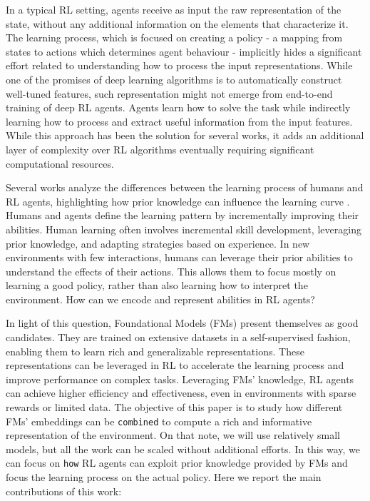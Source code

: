 In a typical RL setting, agents receive as input the raw representation of the state, without any additional information on the elements that characterize it. The learning process, which is focused on creating a policy - a mapping from states to actions which determines agent behaviour - implicitly hides a significant effort related to understanding how to process the input representations. While one of the promises of deep learning algorithms is to automatically construct well-tuned features, such representation might not emerge from end-to-end training of deep RL agents. Agents learn how to solve the task while indirectly learning how to process and extract useful information from the input features. While this approach has been the solution for several works, it adds an additional layer of complexity over RL algorithms eventually requiring significant computational resources.

Several works analyze the differences between the learning process of humans and RL agents, highlighting how prior knowledge can influence the learning curve \citep{lake2017building, dubey2018investigating}. Humans and agents define the learning pattern by incrementally improving their abilities. Human learning often involves incremental skill development, leveraging prior knowledge, and adapting strategies based on experience.
In new environments with few interactions, humans can leverage their prior abilities to understand the effects of their actions. This allows them to focus mostly on learning a good policy, rather than also learning how to interpret the environment. How can we encode and represent abilities in RL agents?

In light of this question, Foundational Models (FMs) present themselves as good candidates. They are trained on extensive datasets in a self-supervised fashion, enabling them to learn rich and generalizable representations. These representations can be leveraged in RL to accelerate the learning process and improve performance on complex tasks. Leveraging FMs' knowledge, RL agents can achieve higher efficiency and effectiveness, even in environments with sparse rewards or limited data. The objective of this paper is to study how different FMs' embeddings can be \texttt{combined} to compute a rich and informative representation of the environment. On that note, we will use relatively small models, but all the work can be scaled without additional efforts.
In this way, we can focus on \texttt{how} RL agents can exploit prior knowledge provided by FMs and focus the learning process on the actual policy. Here we report the main contributions of this work:

